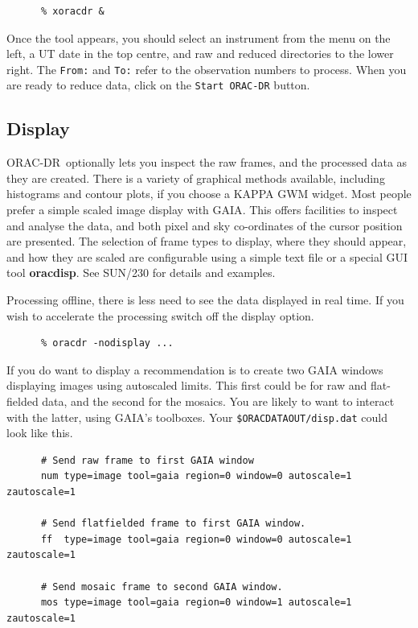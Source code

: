 \documentclass[twoside,11pt]{article}
\newcommand{\xref}[3]{#1}
\newcommand{\xlabel}[1]{}
\renewcommand{\_}{\texttt{\symbol{95}}}
\newcommand{\GAIA}{{\footnotesize GAIA}}
\newcommand{\KAPPA}{{\footnotesize KAPPA}}
\newcommand{\ORACDR}{{\footnotesize ORAC-DR}}
\begin{document}
\begin{verbatim}
      % xoracdr &
\end{verbatim}

Once the tool appears, you should select an instrument from the menu on
the left, a UT date in the top centre, and raw and reduced directories
to the lower right.   The {\tt From:} and {\tt To:} refer to the
observation numbers to process.  When you are ready to reduce data,
click on the {\tt Start ORAC-DR} button.

\subsection{\xlabel{display}Display\label{display}}

\ORACDR\ optionally lets you inspect the raw frames, and the processed
data as they are created.  There is a variety of graphical
methods available, including histograms and contour plots, if you
choose a \xref{\KAPPA}{sun95}{} GWM widget.  Most people prefer a
simple scaled image display with \xref{\GAIA}{sun214}{}.  This offers
facilities to inspect and analyse the data, and both pixel and sky
co-ordinates of the cursor position are presented.  The selection of
frame types to display, where they should appear, and how they are
scaled are configurable using a simple text file or a special GUI tool
{\bf oracdisp}.  See \xref{SUN/230}{sun230}{display_system} for details
and examples.

Processing offline, there is less need to see the data displayed in real time.
If you wish to accelerate the processing switch off the display option.

\begin{verbatim}
      % oracdr -nodisplay ...
\end{verbatim}

If you do want to display a recommendation is to create two GAIA windows
displaying images using autoscaled limits.  This first could be for
raw and flat-fielded data, and the second for the mosaics.  You are
likely to want to interact with the latter, using \GAIA's toolboxes.
Your {\tt \$ORAC\_DATA\_OUT/disp.dat} could look like this.

\begin{verbatim}
      # Send raw frame to first GAIA window 
      num type=image tool=gaia region=0 window=0 autoscale=1 zautoscale=1

      # Send flatfielded frame to first GAIA window.
      ff  type=image tool=gaia region=0 window=0 autoscale=1 zautoscale=1

      # Send mosaic frame to second GAIA window.
      mos type=image tool=gaia region=0 window=1 autoscale=1 zautoscale=1
\end{verbatim}
\end{document}
